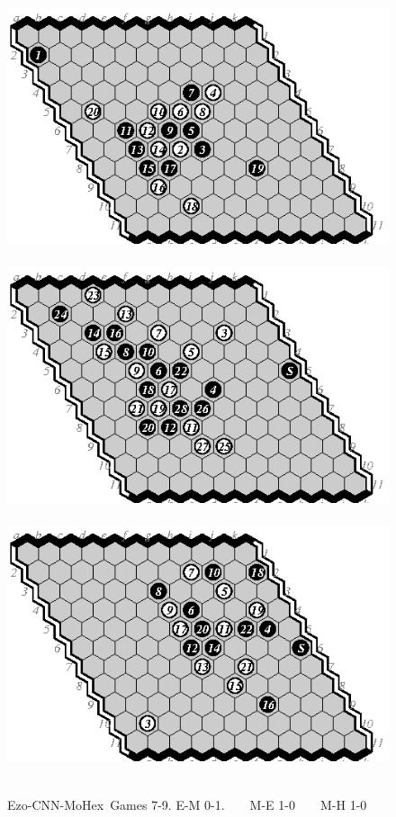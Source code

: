 \documentclass{icga}
\def\Ec{\mbox{\sc Ezo-CNN}}
\def\Mx{\mbox{\sc MoHex}}
\begin{document}
\begin{figure}[hbp]
\includegraphics[scale=1]{pix/11.me7.eps}\hspace*{-1.2cm}\
\includegraphics[scale=1]{pix/11.em8.eps}\hspace*{-1.2cm}\
\includegraphics[scale=1]{pix/11.em9.eps}\hspace*{-1.2cm}\
\caption{\Ec-\Mx\ Games 7-9. E-M 0-1. ~ ~ M-E 1-0 ~ ~ M-H 1-0}
\end{figure}
\end{document}
